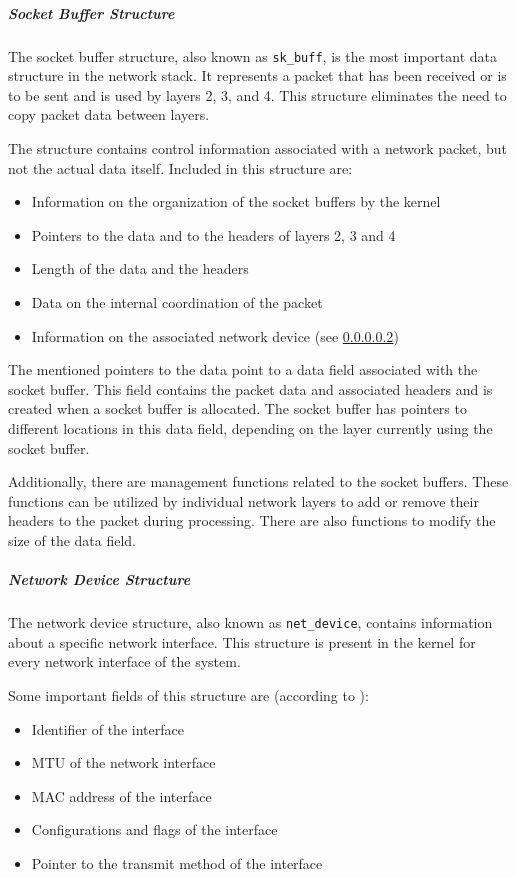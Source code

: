 \subparagraph{Socket Buffer Structure}
The socket buffer structure, also known as \texttt{sk\_buff}, is the most important data structure in the network stack. It represents a packet that has been received or is to be sent and is used by layers 2, 3, and 4. This structure eliminates the need to copy packet data between layers.

The structure contains control information associated with a network packet, but not the actual data itself. Included in this structure are:

\begin{itemize}
\item Information on the organization of the socket buffers by the kernel
\item Pointers to the data and to the headers of layers 2, 3 and 4
\item Length of the data and the headers
\item Data on the internal coordination of the packet
\item Information on the associated network device (see \ref{chap:netdevice})
\end{itemize}

The mentioned pointers to the data point to a data field associated with the socket buffer. This field contains the packet data and associated headers and is created when a socket buffer is allocated. The socket buffer has pointers to different locations in this data field, depending on the layer currently using the socket buffer.

Additionally, there are management functions related to the socket buffers. These functions can be utilized by individual network layers to add or remove their headers to the packet during processing. There are also functions to modify the size of the data field.

\subparagraph{Network Device Structure} \label{chap:netdevice}
The network device structure, also known as \texttt{net\_device}, contains information about a specific network interface. This structure is present in the kernel for every network interface of the system.

Some important fields of this structure are (according to \cite{lins01}):
\begin{itemize}
\item Identifier of the interface
\item MTU of the network interface
\item MAC address of the interface
\item Configurations and flags of the interface
\item Pointer to the transmit method of the interface
\end{itemize}

